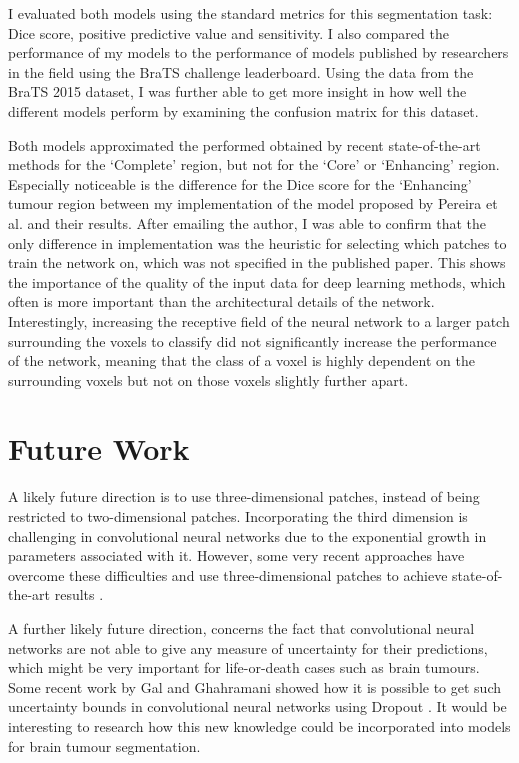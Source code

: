\documentclass[12pt,a4paper,twoside,openright]{report}
\begin{document}
I evaluated both models using the standard metrics for this segmentation task: Dice score, positive predictive value and sensitivity. I also compared the performance of my models to the performance of models published by researchers in the field using the BraTS challenge leaderboard. Using the data from the BraTS 2015 dataset, I was further able to get more insight in how well the different models perform by examining the confusion matrix for this dataset.

Both models approximated the performed obtained by recent state-of-the-art methods for the `Complete' region, but not for the `Core' or `Enhancing' region. Especially noticeable is the difference for the Dice score for the `Enhancing' tumour region between my implementation of the model proposed by Pereira et al. and their results. After emailing the author, I was able to confirm that the only difference in implementation was the heuristic for selecting which patches to train the network on, which was not specified in the published paper. This shows the importance of the quality of the input data for deep learning methods, which often is more important than the architectural details of the network. Interestingly, increasing the receptive field of the neural network to a larger patch surrounding the voxels to classify did not significantly increase the performance of the network, meaning that the class of a voxel is highly dependent on the surrounding voxels but not on those voxels slightly further apart.

\section{Future Work}
A likely future direction is to use three-dimensional patches, instead of being restricted to two-dimensional patches. Incorporating the third dimension is challenging in convolutional neural networks due to the exponential growth in parameters associated with it. However, some very recent approaches have overcome these difficulties and use three-dimensional patches to achieve state-of-the-art results \cite{kamnitsas}. 

A further likely future direction, concerns the fact that convolutional neural networks are not able to give any measure of uncertainty for their predictions, which might be very important for life-or-death cases such as brain tumours. Some recent work by Gal and Ghahramani showed how it is possible to get such uncertainty bounds in convolutional neural networks using Dropout \cite{Gal2015Dropout}. It would be interesting to research how this new knowledge could be incorporated into models for brain tumour segmentation.
\end{document}
